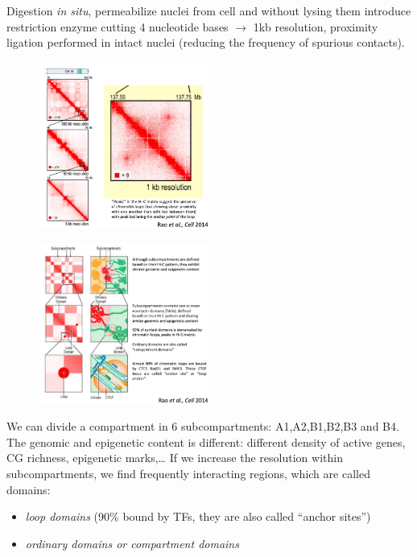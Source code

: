 Digestion \emph{in situ}, permeabilize nuclei from cell and without lysing them introduce restriction enzyme cutting 4 nucleotide bases $\rightarrow$ 1kb resolution, proximity ligation performed in intact nuclei (reducing the frequency of spurious contacts).

\begin{figure}
\centering
\includegraphics[width=0.5\textwidth]{../_resources/Screenshot_2022-10-19_at_09-10-50.png}
\caption{}
\end{figure}

\begin{figure}
\centering
\includegraphics[width=0.5\textwidth]{../_resources/Screenshot_2022-10-19_at_09-11-30.png}
\caption{}
\end{figure}

We can divide a compartment in 6 subcompartments: A1,A2,B1,B2,B3 and B4. The genomic and epigenetic content is different: different density of active genes, CG richness, epigenetic marks,\ldots{} If we increase the resolution within subcompartments, we find frequently interacting regions, which are called domains:

\begin{itemize}
\tightlist
\item
  \emph{loop domains} (90\% bound by TFs, they are also called ``anchor sites'')
\item
  \emph{ordinary domains or compartment domains}
\end{itemize}

